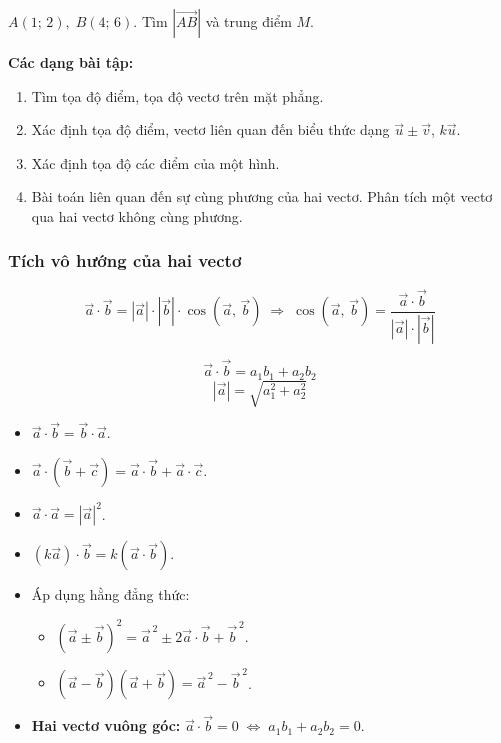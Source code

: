 \documentclass[12pt,a4paper]{article}
\begin{document}
\begin{vidu}
  $A(1;\, 2),\; B(4;\, 6)$. Tìm $|\overrightarrow{AB}|$ và trung điểm $M$.
\end{vidu}

\medskip\noindent\textbf{Các dạng bài tập:}
\begin{enumerate}[label=\textbf{Dạng \arabic*:}, leftmargin=*, align=left]
  \item Tìm tọa độ điểm, tọa độ vectơ trên mặt phẳng.
  \item Xác định tọa độ điểm, vectơ liên quan đến biểu thức dạng $\vec u \pm \vec v$, $k\vec u$.
  \item Xác định tọa độ các điểm của một hình.
  \item Bài toán liên quan đến sự cùng phương của hai vectơ. Phân tích một vectơ qua hai vectơ không cùng phương.
\end{enumerate}

\subsubsection{Tích vô hướng của hai vectơ}

\begin{dinhnghia}
  \[
    \vec a \cdot \vec b = |\vec a| \cdot |\vec b| \cdot \cos(\vec a,\, \vec b)
    \;\Rightarrow\;
    \cos(\vec a,\, \vec b) = \dfrac{\vec a \cdot \vec b}{|\vec a| \cdot |\vec b|}
  \]
\end{dinhnghia}

\begin{congthuc}[title={Tích vô hướng theo tọa độ}]
  \[
    \vec a \cdot \vec b = a_1 b_1 + a_2 b_2
  \]
  \[
    |\vec a| = \sqrt{a_1^2 + a_2^2}
  \]
\end{congthuc}

\begin{tinhchat}
  \begin{itemize}
    \item $\vec a \cdot \vec b = \vec b \cdot \vec a$.
    \item $\vec a \cdot (\vec b + \vec c) = \vec a \cdot \vec b + \vec a \cdot \vec c$.
    \item $\vec a \cdot \vec a = |\vec a|^2$.
    \item $(k\vec a) \cdot \vec b = k(\vec a \cdot \vec b)$.
    \item Áp dụng hằng đẳng thức:
      \begin{itemize}
        \item $(\vec a \pm \vec b)^2 = \vec a^{\,2} \pm 2\vec a \cdot \vec b + \vec b^{\,2}$.
        \item $(\vec a - \vec b)(\vec a + \vec b) = \vec a^{\,2} - \vec b^{\,2}$.
      \end{itemize}
    \item \textbf{Hai vectơ vuông góc:} $\vec a \cdot \vec b = 0 \;\Leftrightarrow\; a_1 b_1 + a_2 b_2 = 0$.
  \end{itemize}
\end{tinhchat}
\end{document}
